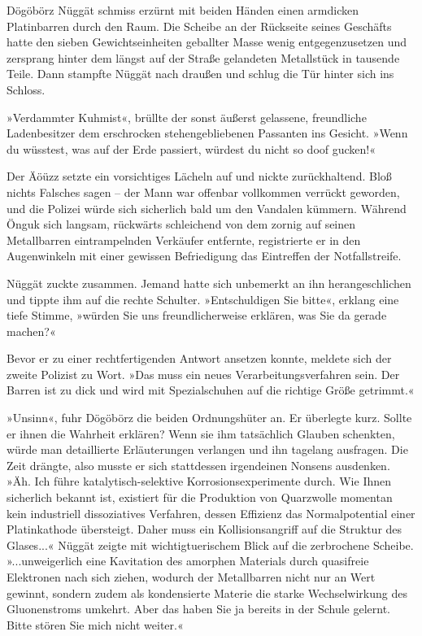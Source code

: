 Dögöbörz Nüggät schmiss erzürnt mit beiden Händen einen armdicken Platinbarren durch den Raum. Die Scheibe an der Rückseite seines Geschäfts hatte den sieben Gewichtseinheiten geballter Masse wenig entgegenzusetzen und zersprang hinter dem längst auf der Straße gelandeten Metallstück in tausende Teile. Dann stampfte Nüggät nach draußen und schlug die Tür hinter sich ins Schloss.

»Verdammter Kuhmist«, brüllte der sonst äußerst gelassene, freundliche Ladenbesitzer dem erschrocken stehengebliebenen Passanten ins Gesicht. »Wenn du wüsstest, was auf der Erde passiert, würdest du nicht so doof gucken!«

Der Äöüzz setzte ein vorsichtiges Lächeln auf und nickte zurückhaltend. Bloß nichts Falsches sagen – der Mann war offenbar vollkommen verrückt geworden, und die Polizei würde sich sicherlich bald um den Vandalen kümmern. Während Önguk sich langsam, rückwärts schleichend von dem zornig auf seinen Metallbarren eintrampelnden Verkäufer entfernte, registrierte er in den Augenwinkeln mit einer gewissen Befriedigung das Eintreffen der Notfallstreife.

Nüggät zuckte zusammen. Jemand hatte sich unbemerkt an ihn herangeschlichen und tippte ihm auf die rechte Schulter. »Entschuldigen Sie bitte«, erklang eine tiefe Stimme, »würden Sie uns freundlicherweise erklären, was Sie da gerade machen?«

Bevor er zu einer rechtfertigenden Antwort ansetzen konnte, meldete sich der zweite Polizist zu Wort. »Das muss ein neues Verarbeitungsverfahren sein. Der Barren ist zu dick und wird mit Spezialschuhen auf die richtige Größe getrimmt.«

»Unsinn«, fuhr Dögöbörz die beiden Ordnungshüter an. Er überlegte kurz. Sollte er ihnen die Wahrheit erklären? Wenn sie ihm tatsächlich Glauben schenkten, würde man detaillierte Erläuterungen verlangen und ihn tagelang ausfragen. Die Zeit drängte, also musste er sich stattdessen irgendeinen Nonsens ausdenken. »Äh. Ich führe katalytisch-selektive Korrosionsexperimente durch. Wie Ihnen sicherlich bekannt ist, existiert für die Produktion von Quarzwolle momentan kein industriell dissoziatives Verfahren, dessen Effizienz das Normalpotential einer Platinkathode übersteigt. Daher muss ein Kollisionsangriff auf die Struktur des Glases...« Nüggät zeigte mit wichtigtuerischem Blick auf die zerbrochene Scheibe. »...unweigerlich eine Kavitation des amorphen Materials durch quasifreie Elektronen nach sich ziehen, wodurch der Metallbarren nicht nur an Wert gewinnt, sondern zudem als kondensierte Materie die starke Wechselwirkung des Gluonenstroms umkehrt. Aber das haben Sie ja bereits in der Schule gelernt.  Bitte stören Sie mich nicht weiter.«

